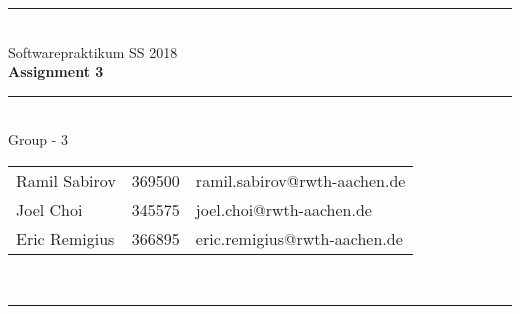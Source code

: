 \documentclass[a4paper,12pt]{article}
\begin{document}
\begin{center}
	\rule{\textwidth}{0.1pt}\\[1cm]
	
	\Large Softwarepraktikum SS 2018\\\bf Assignment 3 %
\end{center}


\begin{center}

	\rule{\textwidth}{0.1pt}\\[0.5cm]

	{\Large Group - 3\\[5mm]} %

	\begin{tabular}{lll}
		Ramil Sabirov & 369500 & ramil.sabirov@rwth-aachen.de\\

		Joel Choi & 345575 & joel.choi@rwth-aachen.de \\

		Eric Remigius & 366895 & eric.remigius@rwth-aachen.de \\

	\end{tabular}\\[0.5cm]

	\rule{\textwidth}{0.1pt}\\[1cm]

\end{center}





\end{document}
